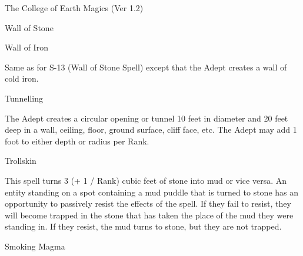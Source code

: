\begin{Chapter}{The College of Earth Magics (Ver 1.2)}
\begin{spell}[S-13]{Wall of Stone }
\begin{effects}
\end{effects}
\end{spell}

\begin{spell}[S-14]{Wall of Iron }

\begin{effects}
 Same  as  for  S-13  (Wall  of  Stone  Spell) 
except that the Adept creates a wall of cold iron. 

\end{effects}
\end{spell}

\begin{spell}[S-15]{Tunnelling }

\begin{effects}
 The  Adept  creates  a  circular  opening  or 
tunnel  10  feet  in  diameter  and  20  feet  deep  in  a 
wall,  ceiling,  floor,  ground  surface,  cliff  face,  etc. 
The Adept may add 1 foot to either depth or radius 
per Rank. 


\end{effects}
\end{spell}

\begin{spell}[S-16]{Trollskin }

\begin{effects}
This spell turns 3 (+ 1 / Rank) cubic feet of 
stone into mud or vice versa. An entity standing on 
a  spot  containing  a  mud  puddle  that  is  turned  to 
stone  has  an  opportunity  to  passively  resist  the 
effects  of  the  spell.  If  they  fail  to  resist,  they  will 
become  trapped  in  the  stone  that  has  taken  the 
place  of  the  mud  they  were  standing  in.  If  they 
resist,  the  mud  turns  to  stone,  but  they  are  not 
trapped. 

\end{effects}
\end{spell}

\begin{spell}[S-17]{Smoking Magma }


\end{spell}
\end{Chapter}
